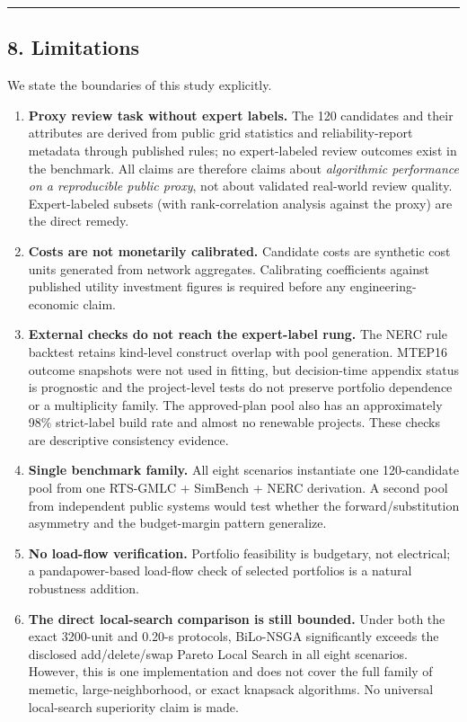 \documentclass[
]{article}
\begin{document}
\begin{center}\rule{0.5\linewidth}{0.5pt}\end{center}

\subsection{8. Limitations}\label{limitations}

We state the boundaries of this study explicitly.

\begin{enumerate}
\def\labelenumi{\arabic{enumi}.}
\item
  \textbf{Proxy review task without expert labels.} The 120 candidates and their attributes are derived from public grid statistics and reliability-report metadata through published rules; no expert-labeled review outcomes exist in the benchmark. All claims are therefore claims about \emph{algorithmic performance on a reproducible public proxy}, not about validated real-world review quality. Expert-labeled subsets (with rank-correlation analysis against the proxy) are the direct remedy.
\item
  \textbf{Costs are not monetarily calibrated.} Candidate costs are synthetic cost units generated from network aggregates. Calibrating coefficients against published utility investment figures is required before any engineering-economic claim.
\item
  \textbf{External checks do not reach the expert-label rung.} The NERC rule backtest retains kind-level construct overlap with pool generation. MTEP16 outcome snapshots were not used in fitting, but decision-time appendix status is prognostic and the project-level tests do not preserve portfolio dependence or a multiplicity family. The approved-plan pool also has an approximately 98\% strict-label build rate and almost no renewable projects. These checks are descriptive consistency evidence.
\item
  \textbf{Single benchmark family.} All eight scenarios instantiate one 120-candidate pool from one RTS-GMLC + SimBench + NERC derivation. A second pool from independent public systems would test whether the forward/substitution asymmetry and the budget-margin pattern generalize.
\item
  \textbf{No load-flow verification.} Portfolio feasibility is budgetary, not electrical; a pandapower-based load-flow check of selected portfolios is a natural robustness addition.
\item
  \textbf{The direct local-search comparison is still bounded.} Under both the exact 3200-unit and 0.20-s protocols, BiLo-NSGA significantly exceeds the disclosed add/delete/swap Pareto Local Search in all eight scenarios. However, this is one implementation and does not cover the full family of memetic, large-neighborhood, or exact knapsack algorithms. No universal local-search superiority claim is made.

\end{enumerate}
\end{document}
